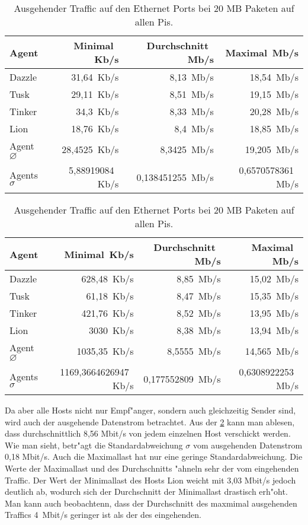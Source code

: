\begin{table}
\centering
\begin{tabular}{l%
 r<{\,Kb/s}%
 r<{\,Mb/s}%
 r<{\,Mb/s}%
}
Agent  				& Minimal		& Durchschnitt		& Maximal	\\
\hline
Dazzle 				& 31,64			& 8,13 			& 18,54		\\
Tusk 				& 29,11			& 8,51			& 19,15		\\
Tinker				& 34,3			& 8,33			& 20,28		\\
Lion				& 18,76			& 8,4			& 18,85		\\ 
Agent $\diameter $	 	& 28,4525		& 8,3425		& 19,205	\\   
Agents $\sigma $		& 5,88919084		& 0,138451255		& 0,6570578361	\\

\end{tabular}
\caption{Eingehender Traffic auf den Ethernet Ports bei 20 Megabyte Paketen auf allen Pis.}
\label{tab:EingehenderTraffic20Mb}
\begin{tabular}{l%
 r<{\,Kb/s}%
 r<{\,Mb/s}%
 r<{\,Mb/s}%
}
Agent  				& Minimal		& Durchschnitt		& Maximal	\\	
\hline
Dazzle 				& 628,48		& 8,85	 		& 15,02		\\
Tusk 				& 61,18			& 8,47			& 15,35		\\
Tinker				& 421,76		& 8,52			& 13,95		\\
Lion				& 3030			& 8,38			& 13,94		\\ 
Agent $\diameter $	 	& 1035,35		& 8,5555		& 14,565	\\   
Agents $\sigma $		& 1169,3664626947	& 0,177552809		& 0,6308922253	\\

\end{tabular}
\caption{Ausgehender Traffic auf den Ethernet Ports bei 20 MB Paketen auf allen Pis.}
\label{tab:AusgehenderTraffic20Mb}

\end{table}

Da aber alle Hosts nicht nur Empf"anger, sondern auch gleichzeitig Sender sind, wird auch der ausgehende %
Datenstrom betrachtet. Aus der \cref{tab:AusgehenderTraffic20Mb} kann man ablesen, dass durchschnittlich %
8,56 Mbit/s von jedem einzelnen Host verschickt werden. Wie man sieht, betr"agt die Standardabweichung %
$\sigma$ vom ausgehenden Datenstrom 0,18 Mbit/s. Auch die Maximallast hat nur eine geringe Standardabweichung. %
Die Werte der Maximallast und des Durchschnitts "ahneln sehr der vom eingehenden Traffic. %
Der Wert der Minimallast des Hosts Lion weicht mit 3,03 Mbit/s jedoch deutlich ab, wodurch sich der %
Durchschnitt der Minimallast drastisch erh"oht. %
Man kann auch beobachtenn, dass der Durchschnitt des maxmimal ausgehenden Traffics \mbox{4 Mbit/s} %
geringer ist als der des eingehenden. %

